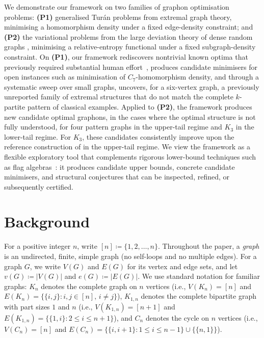 \documentclass{article}
\theoremstyle{plain}
\theoremstyle{definition}
\theoremstyle{remark}
\begin{document}
We demonstrate our framework on two families of graphon optimisation problems: \textbf{(P1)} generalised Tur\'an problems from extremal graph theory, minimising a homomorphism density under a fixed edge-density constraint; and \textbf{(P2)} the variational problems from the large deviation theory of dense random graphs \citep{chatterjee2011large}, minimising a relative-entropy functional under a fixed subgraph-density constraint.
On \textbf{(P1)}, our framework rediscovers nontrivial known optima that previously required substantial human effort~\citep{goodman1959sets,bollobas1976relations,lovasz1983number,fisher1989lower,razborov2008minimal}, produces candidate minimisers for open instances such as minimisation of $C_7$-homomorphism density, and through a systematic sweep over small graphs, uncovers, for a six-vertex graph, a previously unreported family of extremal structures that do not match the complete $k$-partite pattern of classical examples.
Applied to \textbf{(P2)}, the framework produces new candidate optimal graphons, in the cases where the optimal structure is not fully understood, for four pattern graphs in the upper-tail regime and $K_3$ in the lower-tail regime. For $K_3$, these candidates consistently improve upon the reference construction of \citet{lubetzky2015replica} in the upper-tail regime.
We view the framework as a flexible exploratory tool that complements rigorous lower-bound techniques such as flag algebras~\citep{razborov2007flag,falgas2013applications}: it produces candidate upper bounds, concrete candidate minimisers, and structural conjectures that can be inspected, refined, or subsequently certified.

\section{Background} \label{sec:background}

For a positive integer $n$, write $[n] \coloneqq \{1,2,\ldots,n\}$. Throughout the paper, a \emph{graph} is an undirected, finite, simple graph (no self-loops and no multiple edges). For a graph $G$, we write $V(G)$ and $E(G)$ for its vertex and edge sets, and let $v(G) \coloneqq |V(G)|$ and $e(G) \coloneqq |E(G)|$. We use standard notation for familiar graphs: $K_n$ denotes the complete graph on $n$ vertices (i.e., $V(K_n) = [n]$ and $E(K_n) = \{\{i,j\} : i, j \in [n],\, i \neq j\}$), $K_{1,n}$ denotes the complete bipartite graph with part sizes $1$ and $n$ (i.e., $V(K_{1,n}) = [n+1]$ and $E(K_{1,n}) = \{\{1,i\} : 2\le i\le n+1\}$), and $C_n$ denotes the cycle on $n$ vertices (i.e., $V(C_n) = [n]$ and $E(C_n) = \{\{i,i+1\} : 1\le i\le n-1\} \cup \{\{n,1\}\}$).
\end{document}
